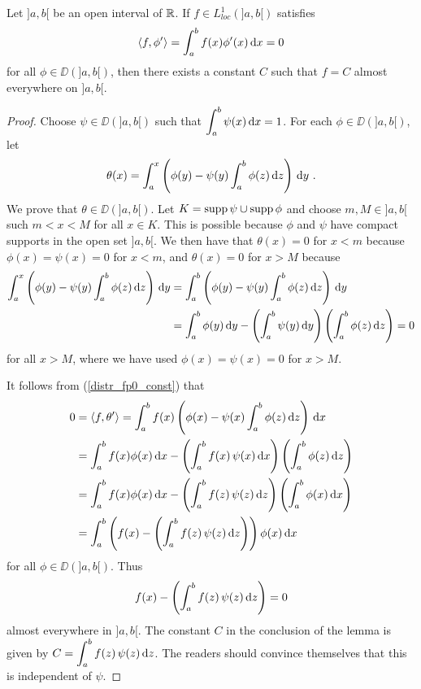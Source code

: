 \begin{lemma} %
Let $]a,b[$ be an open interval of $\mathbb{R}$.  If     \label{distr_der0_eq_const}
$\displaystyle f \in L^1_{loc}(]a,b[)$ satisfies
\begin{equation} \label{distr_fp0_const}
\left\langle{f} , {\phi'}\right\rangle = \int_a^b f(x) \phi'(x) \,\mathrm{d}{x} = 0
\end{equation}
for all $\phi \in \DD(]a,b[)$, then there exists a constant $C$ such
that $f=C$ almost everywhere on $]a,b[$.
\end{lemma}

\begin{proof}
Choose $\psi \in \DD(]a,b[)$ such that
$\displaystyle \int_a^b \psi(x)\,\mathrm{d}{x}=1$.  For each
$\phi \in \DD(]a,b[)$, let
\[
\theta(x) = \int_a^x \left( \phi(y) - \psi(y) \int_a^b
\phi(z)\,\mathrm{d}{z}\right) \,\mathrm{d}{y} \ .
\]
We prove that $\theta \in \DD(]a,b[)$. Let $K = \operatorname{supp} \psi \cup \operatorname{supp} \phi$
and choose $m, M \in ]a,b[$ such $m < x < M$ for all $x \in K$.
This is possible because $\phi$ and $\psi$ have compact supports in
the open set $]a,b[$.  We then have that
$\theta(x) = 0$ for $x<m$ because $\phi(x) = \psi(x) = 0$ for $x<m$,
and $\theta(x) = 0$ for $x>M$ because
\begin{align*}
\int_a^x \left( \phi(y) - \psi(y) \int_a^b \phi(z)\,\mathrm{d}{z}\right) \,\mathrm{d}{y} &=
\int_a^b \left( \phi(y) - \psi(y) \int_a^b \phi(z)\,\mathrm{d}{z}\right) \,\mathrm{d}{y} \\
&= \int_a^b \phi(y) \,\mathrm{d}{y} - \left(\int_a^b \psi(y) \,\mathrm{d}{y}\right)
\left( \int_a^b \phi(z)\,\mathrm{d}{z}\right) = 0
\end{align*}
for all $x >M$, where we have used $\phi(x)=\psi(x) = 0$ for $x>M$.

It follows from (\ref{distr_fp0_const}) that
\begin{align*}
0 &= \left\langle{f} , {\theta'}\right\rangle = \int_a^b f(x) \left( \phi(x) - \psi(x) \int_a^b
\phi(z)\,\mathrm{d}{z}\right) \,\mathrm{d}{x} \\
&= \int_a^b f(x) \phi(x) \,\mathrm{d}{x} -
\left( \int_a^b f(x) \,\psi(x) \,\mathrm{d}{x}\right)
\left(\int_a^b \phi(z)\,\mathrm{d}{z}\right) \\
&= \int_a^b f(x) \phi(x) \,\mathrm{d}{x} -
\left( \int_a^b f(z) \, \psi(z) \,\mathrm{d}{z}\right)
\left(\int_a^b \phi(x)\,\mathrm{d}{x}\right) \\
&= \int_a^b \left( f(x) - \left( \int_a^b f(z)\,\psi(z) \,\mathrm{d}{z}\right) \right)
\phi(x)\,\mathrm{d}{x}
\end{align*}
for all $\phi \in \DD(]a,b[)$.  Thus
\[
f(x) - \left( \int_a^b f(z)\,\psi(z) \,\mathrm{d}{z}\right) = 0
\]
almost everywhere in $]a,b[$.
The constant $C$ in the conclusion of the lemma is given by
$\displaystyle C = \int_a^b f(z)\,\psi(z) \,\mathrm{d}{z}$.  The readers should
convince themselves that this is independent of $\psi$.
\end{proof}

